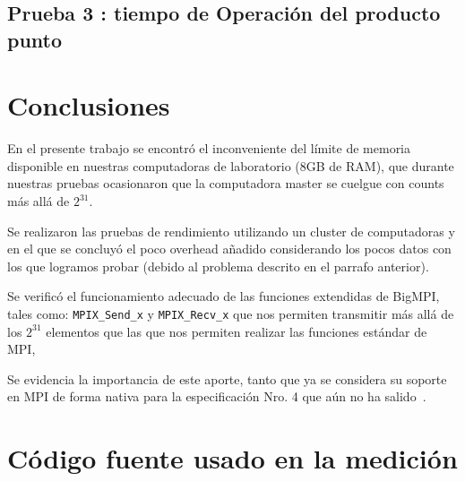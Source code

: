 \documentclass[conference]{IEEEtran}
\begin{document}
\subsection{Prueba 3 : tiempo de Operación del producto punto}
\begin{table}[htb]
\caption{Algoritmo de prueba con 2GB de carga}
\label{1234}
\end{table}

\section{Conclusiones}
En el presente trabajo se encontró el inconveniente del límite de memoria disponible
en nuestras computadoras de laboratorio (8GB de RAM), que durante nuestras pruebas
ocasionaron que la computadora master se cuelgue con counts más allá de $2^{31}$.

Se realizaron las pruebas de rendimiento utilizando un cluster
de computadoras y en el que se concluyó el poco overhead añadido considerando los pocos
datos con los que logramos probar (debido al problema descrito en el parrafo anterior).

Se verificó el funcionamiento adecuado de las funciones extendidas de BigMPI,
tales como: \texttt{MPIX\_Send\_x}
y \texttt{MPIX\_Recv\_x} que nos permiten transmitir más allá de los $2^{31}$ elementos
que las que nos permiten realizar las funciones estándar de MPI,

Se evidencia la importancia de este aporte, tanto que ya se considera su soporte en MPI de forma
nativa para la especificación Nro. 4 que aún no ha salido~\cite{mpi4}.


\onecolumn
\appendices
\section{Código fuente usado en la medición}






\clearpage
\newpage
\twocolumn
\end{document}
